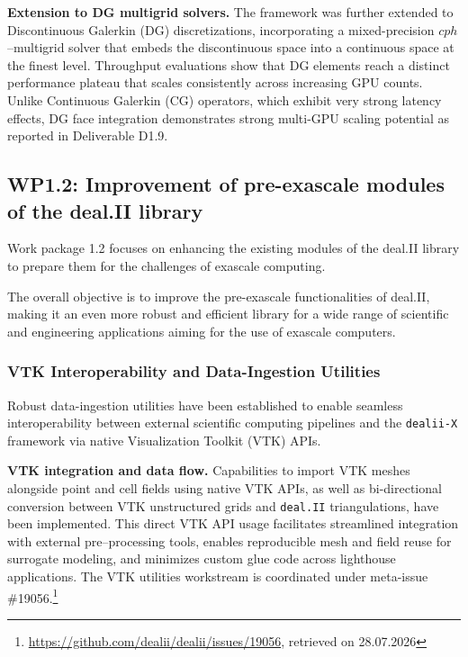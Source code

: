 \documentclass[a4paper,12pt, numbers]{article}
\newcommand{\dealii}{\texttt{deal.II}}
\begin{document}
\noindent\textbf{Extension to DG multigrid solvers.}
The framework was further extended to Discontinuous Galerkin (DG) discretizations, incorporating a mixed-precision $cph$--multi\-grid solver that embeds the discontinuous space into a continuous space at the finest level. Throughput evaluations show that DG elements reach a distinct performance plateau that scales consistently across increasing GPU counts. Unlike Continuous Galerkin (CG) operators, which exhibit very strong latency effects, DG face integration demonstrates strong multi-GPU scaling potential as reported in Deliverable D1.9.



\subsection{WP1.2: Improvement of pre-exascale modules of the deal.II library} %

Work package 1.2 focuses on enhancing the existing modules of the deal.II library to prepare them for the challenges of exascale computing.  

The overall objective is to improve the pre-exascale functionalities of deal.II,
making it an even more robust and efficient library for a wide range of
scientific and engineering applications aiming for the use of exascale
computers.

\subsubsection*{VTK Interoperability and Data-Ingestion Utilities}

\noindent Robust data-ingestion utilities have been established to enable seamless interoperability between external scientific computing pipelines and the \texttt{dealii-X} framework via native Visualization Toolkit (VTK) APIs.

\noindent\textbf{VTK integration and data flow.}
Capabilities to import VTK meshes alongside point and cell fields using native VTK APIs, as well as bi-directional conversion between VTK unstructured grids and \dealii{} triangulations, have been implemented. This direct VTK API usage facilitates streamlined integration with external pre--processing tools, enables reproducible mesh and field reuse for surrogate modeling, and minimizes custom glue code across lighthouse applications. The VTK utilities workstream is coordinated under meta-issue \#19056.\footnote{\url{https://github.com/dealii/dealii/issues/19056}, retrieved on 28.07.2026}
\end{document}

